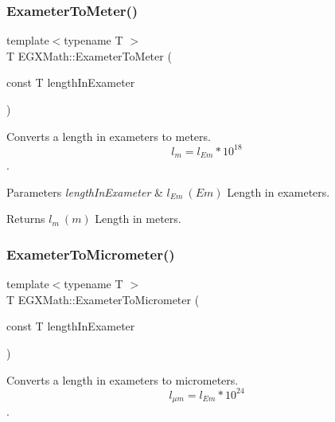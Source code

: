 \subsubsection{\texorpdfstring{Exameter\+To\+Meter()}{ExameterToMeter()}}
{\footnotesize\ttfamily template$<$typename T $>$ \\
T E\+G\+X\+Math\+::\+Exameter\+To\+Meter (\begin{DoxyParamCaption}\item[{const T}]{length\+In\+Exameter }\end{DoxyParamCaption})}



Converts a length in exameters to meters. \[ l_{m}=l_{Em} * 10^{18} \]. 


\begin{DoxyParams}{Parameters}
{\em length\+In\+Exameter} & $ l_{Em}\ (Em)$ Length in exameters. \\
\hline
\end{DoxyParams}
\begin{DoxyReturn}{Returns}
$ l_{m}\ (m)$ Length in meters. 
\end{DoxyReturn}
\mbox{\label{group___e_g_x_math-_conversions-_length_conversions-_exameter-_s_i_gaee4a8b1fa77d023e7db7180e62646388}} 
\subsubsection{\texorpdfstring{Exameter\+To\+Micrometer()}{ExameterToMicrometer()}}
{\footnotesize\ttfamily template$<$typename T $>$ \\
T E\+G\+X\+Math\+::\+Exameter\+To\+Micrometer (\begin{DoxyParamCaption}\item[{const T}]{length\+In\+Exameter }\end{DoxyParamCaption})}



Converts a length in exameters to micrometers. \[ l_{\mu m}=l_{Em} * 10^{24} \]. 

